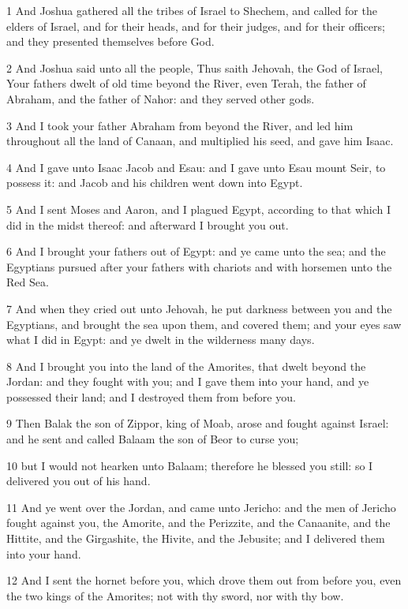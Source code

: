 \par 1 And Joshua gathered all the tribes of Israel to Shechem, and called for the elders of Israel, and for their heads, and for their judges, and for their officers; and they presented themselves before God.
\par 2 And Joshua said unto all the people, Thus saith Jehovah, the God of Israel, Your fathers dwelt of old time beyond the River, even Terah, the father of Abraham, and the father of Nahor: and they served other gods.
\par 3 And I took your father Abraham from beyond the River, and led him throughout all the land of Canaan, and multiplied his seed, and gave him Isaac.
\par 4 And I gave unto Isaac Jacob and Esau: and I gave unto Esau mount Seir, to possess it: and Jacob and his children went down into Egypt.
\par 5 And I sent Moses and Aaron, and I plagued Egypt, according to that which I did in the midst thereof: and afterward I brought you out.
\par 6 And I brought your fathers out of Egypt: and ye came unto the sea; and the Egyptians pursued after your fathers with chariots and with horsemen unto the Red Sea.
\par 7 And when they cried out unto Jehovah, he put darkness between you and the Egyptians, and brought the sea upon them, and covered them; and your eyes saw what I did in Egypt: and ye dwelt in the wilderness many days.
\par 8 And I brought you into the land of the Amorites, that dwelt beyond the Jordan: and they fought with you; and I gave them into your hand, and ye possessed their land; and I destroyed them from before you.
\par 9 Then Balak the son of Zippor, king of Moab, arose and fought against Israel: and he sent and called Balaam the son of Beor to curse you;
\par 10 but I would not hearken unto Balaam; therefore he blessed you still: so I delivered you out of his hand.
\par 11 And ye went over the Jordan, and came unto Jericho: and the men of Jericho fought against you, the Amorite, and the Perizzite, and the Canaanite, and the Hittite, and the Girgashite, the Hivite, and the Jebusite; and I delivered them into your hand.
\par 12 And I sent the hornet before you, which drove them out from before you, even the two kings of the Amorites; not with thy sword, nor with thy bow.
